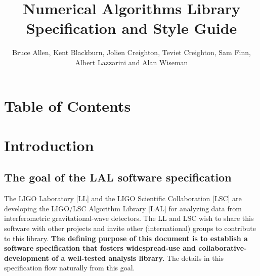 \documentclass[]{ligodcc}
\title{Numerical Algorithms Library
Specification and Style Guide}
\author{Bruce Allen, Kent Blackburn, Jolien Creighton, Teviet
Creighton, Sam Finn, Albert Lazzarini and  Alan Wiseman}
\begin{document}
\maketitle

\section{Table of Contents}
\tableofcontents
\listoftables
\clearpage


\section{Introduction}
\label{introduction}

\subsection{The goal of the  LAL software specification}

The LIGO Laboratory [LL] and  the LIGO Scientific Collaboration [LSC]
are  developing  the LIGO/LSC Algorithm Library [LAL] for analyzing
data from interferometric gravitational-wave detectors.  The LL and
LSC wish to share this software with other projects and invite other
(international) groups  to contribute to this library.  {\bf The defining
purpose of this document is to establish a software specification that
fosters widespread-use and  collaborative-development  of  a
well-tested analysis  library.} The details in this specification flow
naturally from this goal.
\end{document}
